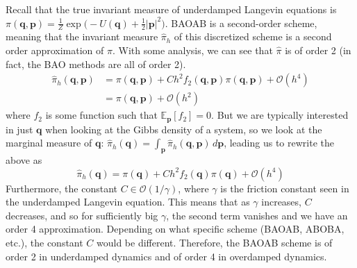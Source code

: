 \documentclass{article}
\theoremstyle{remark}
\theoremstyle{definition}
\begin{document}
Recall that the true invariant measure of underdamped Langevin equations is $\pi(\mathbf{q}, \mathbf{p}) = \frac{1}{Z} \exp \big( -U(\mathbf{q}) + \frac{1}{2} |\mathbf{p}|^2 \big)$. BAOAB is a second-order scheme, meaning that the invariant measure $\hat{\pi}_h$ of this discretized scheme is a second order approximation of $\pi$. With some analysis, we can see that $\hat{\pi}$ is of order 2 (in fact, the BAO methods are all of order 2). 
\begin{align*}
    \hat{\pi}_h (\mathbf{q}, \mathbf{p}) & = \pi(\mathbf{q}, \mathbf{p}) + C h^2 f_2 (\mathbf{q}, \mathbf{p}) \pi(\mathbf{q}, \mathbf{p}) + \mathcal{O}(h^4) \\
    & = \pi(\mathbf{q}, \mathbf{p}) + \mathcal{O}(h^2)
\end{align*}
where $f_2$ is some function such that $\mathbb{E}_\mathbf{p} [f_2] = 0$. But we are typically interested in just $\mathbf{q}$ when looking at the Gibbs density of a system, so we look at the marginal measure of $\mathbf{q}$: $\hat{\pi}_h (\mathbf{q}) = \int_\mathbf{p} \hat{\pi}_h (\mathbf{q}, \mathbf{p})\, d\mathbf{p}$, leading us to rewrite the above as
\[\hat{\pi}_h (\mathbf{q}) = \pi(\mathbf{q}) + C h^2 f_2 (\mathbf{q}) \pi(\mathbf{q}) + \mathcal{O}(h^4)\]
Furthermore, the constant $C \in \mathcal{O}(1/ \gamma)$, where $\gamma$ is the friction constant seen in the underdamped Langevin equation. This means that as $\gamma$ increases, $C$ decreases, and so for sufficiently big $\gamma$, the second term vanishes and we have an order 4 approximation. Depending on what specific scheme (BAOAB, ABOBA, etc.), the constant $C$ would be different. Therefore, the BAOAB scheme is of order 2 in underdamped dynamics and of order 4 in overdamped dynamics. 
\end{document}
